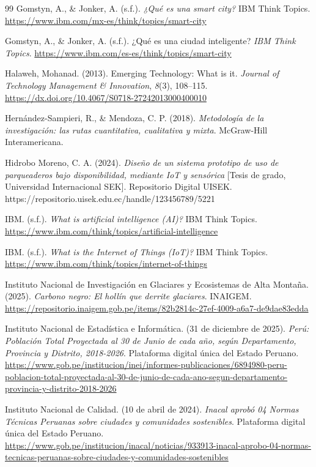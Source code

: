 \documentclass[12pt,a4paper]{article}
\begin{document}
\begin{thebibliography}{99}
	Gomstyn, A., \& Jonker, A. (s.f.).
	\textit{¿Qué es una smart city?}
	IBM Think Topics.
	\url{https://www.ibm.com/mx-es/think/topics/smart-city}
	
	Gomstyn, A., \& Jonker, A. (s.f.).
	¿Qué es una ciudad inteligente?
	\textit{IBM Think Topics}.
	\url{https://www.ibm.com/es-es/think/topics/smart-city}
	
	Halaweh, Mohanad. (2013).
	Emerging Technology: What is it.
	\textit{Journal of Technology Management \& Innovation}, \textit{8}(3), 108--115.
	\url{https://dx.doi.org/10.4067/S0718-27242013000400010}
	
	Hernández-Sampieri, R., \& Mendoza, C. P. (2018).
	\textit{Metodología de la investigación: las rutas cuantitativa, cualitativa y mixta}.
	McGraw-Hill Interamericana.
	
	Hidrobo Moreno, C. A. (2024).
	\textit{Diseño de un sistema prototipo de uso de parqueaderos bajo disponibilidad, mediante IoT y sensórica}
	[Tesis de grado, Universidad Internacional SEK].
	Repositorio Digital UISEK.
	https://repositorio.uisek.edu.ec/handle/123456789/5221
	
	IBM. (s.f.).
	\textit{What is artificial intelligence (AI)?}
	IBM Think Topics.
	\url{https://www.ibm.com/think/topics/artificial-intelligence}
	
	IBM. (s.f.).
	\textit{What is the Internet of Things (IoT)?}
	IBM Think Topics.
	\url{https://www.ibm.com/think/topics/internet-of-things}
	
	Instituto Nacional de Investigación en Glaciares y Ecosistemas de Alta Montaña. (2025).
	\textit{Carbono negro: El hollín que derrite glaciares}.
	INAIGEM.
	\url{https://repositorio.inaigem.gob.pe/items/82b2814c-27ef-4009-a6a7-de9dae83edda}
	
	Instituto Nacional de Estadística e Informática. (31 de diciembre de 2025).
	\textit{Perú: Población Total Proyectada al 30 de Junio de cada año, según Departamento, Provincia y Distrito, 2018-2026}.
	Plataforma digital única del Estado Peruano.
	\url{https://www.gob.pe/institucion/inei/informes-publicaciones/6894980-peru-poblacion-total-proyectada-al-30-de-junio-de-cada-ano-segun-departamento-provincia-y-distrito-2018-2026}
	
	Instituto Nacional de Calidad. (10 de abril de 2024).
	\textit{Inacal aprobó 04 Normas Técnicas Peruanas sobre ciudades y comunidades sostenibles}.
	Plataforma digital única del Estado Peruano.
	\url{https://www.gob.pe/institucion/inacal/noticias/933913-inacal-aprobo-04-normas-tecnicas-peruanas-sobre-ciudades-y-comunidades-sostenibles}
	

\end{thebibliography}
\end{document}
